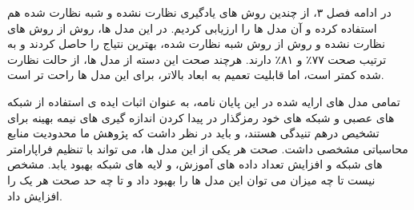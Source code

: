 در ادامه فصل ۳، از چندین روش های یادگیری نظارت نشده و شبه نظارت شده هم استفاده کرده و آن مدل ها را ارزیابی کردیم. در این مدل ها، روش
از روش های نظارت نشده و روش
از روش شبه نظارت شده، بهترین نتیاج را حاصل کردند و به ترتیب صحت
۷۷٪
و
۸۱٪
دارند.
هرچند صحت این دسته از مدل ها، از حالت نظارت شده کمتر است، اما قابلیت تعمیم به ابعاد بالاتر، برای این مدل ها راحت تر است.

تمامی مدل های ارایه شده در این پایان نامه، به عنوان اثبات ایده ی استفاده از شبکه های عصبی و شبکه های خود رمزگذار در پیدا کردن اندازه گیری های نیمه بهینه برای تشخیص درهم تنیدگی هستند، و باید در نظر داشت که پژوهش ما محدودیت منابع محاسباتی مشخصی داشت. صحت هر یکی از این مدل ها، می تواند با تنظیم فراپارامتر های
شبکه و افزایش تعداد داده های آموزش، و لایه های شبکه بهبود یابد. مشخص نیست تا چه میزان می توان این مدل ها را بهبود داد و تا چه حد صحت هر یک را افزایش داد.
